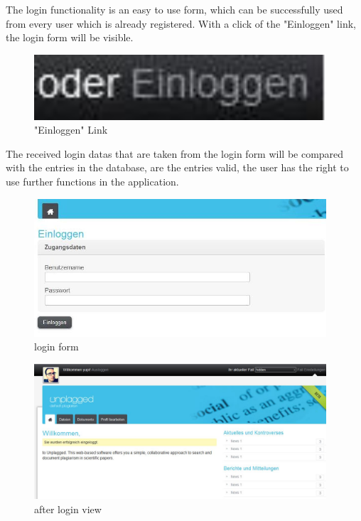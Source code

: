The login functionality is an easy to use form, which can be successfully used from every user which is already registered. With a click of the "Einloggen" link, the login form will be visible.
\begin{figure}[!ht]
  \centering
    \includegraphics[width=0.97\textwidth]{images/basic_functionalities/oderEinloggen.jpg}
  \caption{"Einloggen" Link}
  \label{fig:einloggen}
\end{figure}

The received login datas that are taken from the login form will be compared with the entries in the database, are the entries valid, the user has the right to use further functions in the application.

\begin{figure}[!ht]
  \centering
    \includegraphics[width=0.97\textwidth]{images/basic_functionalities/login_form.jpg}
  \caption{login form}
  \label{fig:einloggen}
\end{figure}

\begin{figure}[!ht]
  \centering
    \includegraphics[width=0.97\textwidth]{images/basic_functionalities/after_login.jpg}
  \caption{after login view}
  \label{fig:einloggen}
\end{figure}
